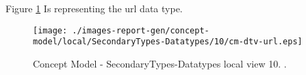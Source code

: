 Figure \ref{fig:lu.uni.lassy.excalibur.group09.spec-CM-view-local-SecondaryTypes-Datatypes-10} Is representing the url data type.



\begin{figure}[htbp] 
\label{fig:lu.uni.lassy.excalibur.group09.spec-CM}
\begin{center}
\texttt{[image: ./images-report-gen/concept-model/local/SecondaryTypes-Datatypes/10/cm-dtv-url.eps]}
\end{center}
\caption[Concept Model - SecondaryTypes-Datatypes local view 10 - ]{Concept Model - SecondaryTypes-Datatypes local view 10. .}
\label{fig:lu.uni.lassy.excalibur.group09.spec-CM-view-local-SecondaryTypes-Datatypes-10}
\end{figure}
\vspace{0.5cm} 

